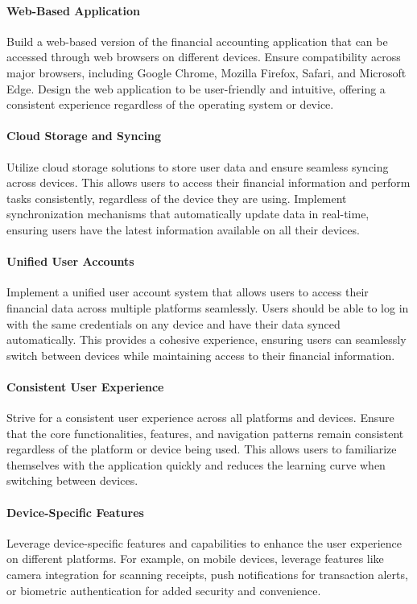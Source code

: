 \paragraph{Web-Based Application}
Build a web-based version of the financial accounting application that can be accessed through web browsers on 
different devices. Ensure compatibility across major browsers, including Google Chrome, Mozilla Firefox, Safari, 
and Microsoft Edge. Design the web application to be user-friendly and intuitive, offering a consistent experience 
regardless of the operating system or device.

\paragraph{Cloud Storage and Syncing}
Utilize cloud storage solutions to store user data and ensure seamless syncing across devices. This allows users 
to access their financial information and perform tasks consistently, regardless of the device they are using. 
Implement synchronization mechanisms that automatically update data in real-time, ensuring users have the latest 
information available on all their devices.

\paragraph{Unified User Accounts}
Implement a unified user account system that allows users to access their financial data across multiple platforms 
seamlessly. Users should be able to log in with the same credentials on any device and have their data synced 
automatically. This provides a cohesive experience, ensuring users can seamlessly switch between devices while 
maintaining access to their financial information.

\paragraph{Consistent User Experience}
Strive for a consistent user experience across all platforms and devices. Ensure that the core functionalities, 
features, and navigation patterns remain consistent regardless of the platform or device being used. This allows 
users to familiarize themselves with the application quickly and reduces the learning curve when switching between 
devices.

\paragraph{Device-Specific Features}
Leverage device-specific features and capabilities to enhance the user experience on different platforms. For 
example, on mobile devices, leverage features like camera integration for scanning receipts, push notifications 
for transaction alerts, or biometric authentication for added security and convenience.

